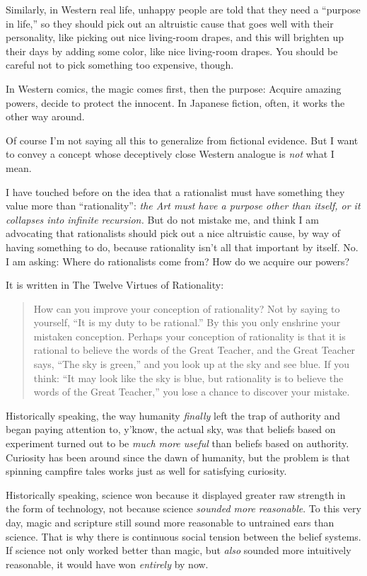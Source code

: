  Similarly, in Western real life, unhappy people are told that they
need a ``purpose in life,'' so they
should pick out an altruistic cause that goes well with their
personality, like picking out nice living-room drapes, and this will
brighten up their days by adding some color, like nice living-room
drapes. You should be careful not to pick something too expensive,
though.


 In Western comics, the magic comes first, then the purpose:
Acquire amazing powers, decide to protect the innocent. In Japanese
fiction, often, it works the other way around.


 Of course I'm not saying all this to generalize
from fictional evidence. But I want to convey a concept whose
deceptively close Western analogue is \textit{not} what I mean.


 I have touched before on the idea that a rationalist must have
something they value more than
``rationality'': \textit{the Art
must have a purpose other than itself, or it collapses into infinite
recursion.} But do not mistake me, and think I am advocating that
rationalists should pick out a nice altruistic cause, by way of having
something to do, because rationality isn't all that
important by itself. No. I am asking: Where do rationalists come from?
How do we acquire our powers?


 It is written in The Twelve Virtues of Rationality:

\begin{quote}
{
 How can you improve your conception of rationality? Not by saying
to yourself, ``It is my duty to be
rational.'' By this you only enshrine your mistaken
conception. Perhaps your conception of rationality is that it is
rational to believe the words of the Great Teacher, and the Great
Teacher says, ``The sky is green,''
and you look up at the sky and see blue. If you think:
``It may look like the sky is blue, but rationality is
to believe the words of the Great Teacher,'' you lose
a chance to discover your mistake.}
\end{quote}


 Historically speaking, the way humanity \textit{finally} left the
trap of authority and began paying attention to,
y'know, the actual sky, was that beliefs based on
experiment turned out to be \textit{much more useful} than beliefs
based on authority. Curiosity has been around since the dawn of
humanity, but the problem is that spinning campfire tales works just as
well for satisfying curiosity.


 Historically speaking, science won because it displayed greater
raw strength in the form of technology, not because science
\textit{sounded more reasonable}. To this very day, magic and scripture
still sound more reasonable to untrained ears than science. That is why
there is continuous social tension between the belief systems. If
science not only worked better than magic, but \textit{also} sounded
more intuitively reasonable, it would have won \textit{entirely} by
now.


